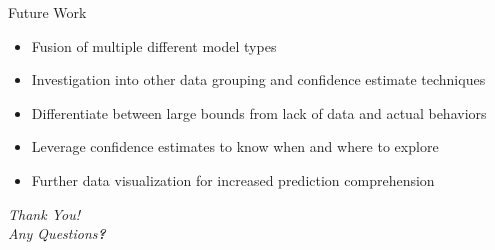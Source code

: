 \documentclass{beamer}
\begin{document}
\begin{frame}[t]{Future Work}

  \begin{itemize}
    \setlength\itemsep{1em}
      \item Fusion of multiple different model types
      \item Investigation into other data grouping and confidence estimate techniques
      \item Differentiate between large bounds from lack of data and actual behaviors
      \item Leverage confidence estimates to know when and where to explore
      \item Further data visualization for increased prediction comprehension

  \end{itemize}

\end{frame}


\begin{frame}

  \centering \huge
  \emph{Thank You!} \\
  \vspace*{1cm}
  \large
  \emph{Any Questions\textbf{?}}

\end{frame}
\end{document}
